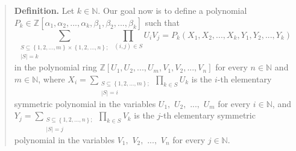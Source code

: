 \documentclass[numbers=enddot,12pt,final,onecolumn,notitlepage]{scrartcl}%
\begin{document}
\begin{quote}
\textbf{Definition.} Let $k\in\mathbb{N}$. Our goal now is to define a
polynomial $P_{k}\in\mathbb{Z}\left[  \alpha_{1},\alpha_{2},...,\alpha
_{k},\beta_{1},\beta_{2},...,\beta_{k}\right]  $ such that%
\begin{equation}
\sum_{\substack{S\subseteq\left\{  1,2,...,m\right\}  \times\left\{
1,2,...,n\right\}  ;\\\left\vert S\right\vert =k}}\prod_{\left(  i,j\right)
\in S}U_{i}V_{j}=P_{k}\left(  X_{1},X_{2},...,X_{k},Y_{1},Y_{2},...,Y_{k}%
\right)  \label{Pk1}%
\end{equation}
in the polynomial ring $\mathbb{Z}\left[  U_{1},U_{2},...,U_{m},V_{1}%
,V_{2},...,V_{n}\right]  $ for every $n\in\mathbb{N}$ and $m\in\mathbb{N}$,
where $X_{i}=\sum\limits_{\substack{S\subseteq\left\{  1,2,...,m\right\}
;\\\left\vert S\right\vert =i}}\prod\limits_{k\in S}U_{k}$ is the $i$-th
elementary symmetric polynomial in the variables $U_{1},$ $U_{2},$ $...,$
$U_{m}$ for every $i\in\mathbb{N}$, and $Y_{j}=\sum
\limits_{\substack{S\subseteq\left\{  1,2,...,n\right\}  ;\\\left\vert
S\right\vert =j}}\prod\limits_{k\in S}V_{k}$ is the $j$-th elementary
symmetric polynomial in the variables $V_{1},$ $V_{2},$ $...,$ $V_{n}$ for
every $j\in\mathbb{N}$.


\end{quote}
\end{document}
